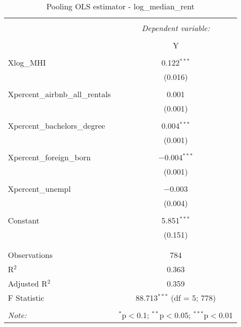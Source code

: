 \documentclass{article}
\begin{document}
\begin{table}[!htbp] \centering 
  \caption{Pooling OLS estimator - log\_median\_rent} 
  \label{} 
  \begin{tabular}{@{\extracolsep{5pt}}lc} 
    \\[-1.8ex]\hline 
    \hline \\[-1.8ex] 
    & \multicolumn{1}{c}{\textit{Dependent variable:}} \\ 
    \cline{2-2} 
    \\[-1.8ex] & Y \\ 
    \hline \\[-1.8ex] 
    Xlog\_MHI & 0.122$^{***}$ \\ 
    & (0.016) \\ 
    & \\ 
    Xpercent\_airbnb\_all\_rentals & 0.001 \\ 
    & (0.001) \\ 
    & \\ 
    Xpercent\_bachelors\_degree & 0.004$^{***}$ \\ 
    & (0.001) \\ 
    & \\ 
    Xpercent\_foreign\_born & $-$0.004$^{***}$ \\ 
    & (0.001) \\ 
    & \\ 
    Xpercent\_unempl & $-$0.003 \\ 
    & (0.004) \\ 
    & \\ 
    Constant & 5.851$^{***}$ \\ 
    & (0.151) \\ 
    & \\ 
    \hline \\[-1.8ex] 
    Observations & 784 \\ 
    R$^{2}$ & 0.363 \\ 
    Adjusted R$^{2}$ & 0.359 \\ 
    F Statistic & 88.713$^{***}$ (df = 5; 778) \\ 
    \hline 
    \hline \\[-1.8ex] 
    \textit{Note:}  & \multicolumn{1}{r}{$^{*}$p$<$0.1; $^{**}$p$<$0.05; $^{***}$p$<$0.01} \\ 
  \end{tabular} 
\end{table} 
\end{document}
